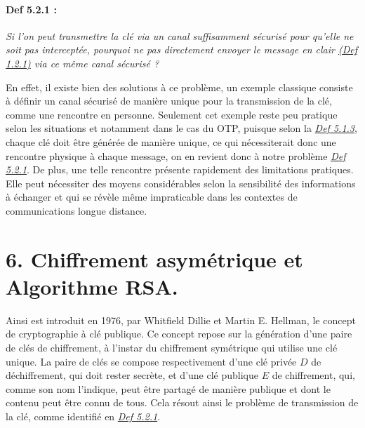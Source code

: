 \documentclass[
  paper=a4,
  ,captions=tableheading
]{scrartcl}
\begin{document}
\paragraph{Def 5.2.1 :}\label{def-5.2.1}

\emph{Si l'on peut transmettre la clé via un canal suffisamment sécurisé
pour qu'elle ne soit pas interceptée, pourquoi ne pas directement
envoyer le message en clair
\href{Introduction\%20au\%20Chiffrement\%20-\%20Théories\%20et\%20Pratiques\%20du\%20Chiffrement\%20Symétrique\%20et\%20Asymétrique\%20avec\%20une\%20Étude\%20de\%20Cas\%20sur\%20l'Algorithme\%20RSA.\#Def\%201.2.1}{(Def
1.2.1)} via ce même canal sécurisé ?}

En effet, il existe bien des solutions à ce problème, un exemple
classique consiste à définir un canal sécurisé de manière unique pour la
transmission de la clé, comme une rencontre en personne. Seulement cet
exemple reste peu pratique selon les situations et notamment dans le cas
du OTP, puisque selon la
\emph{\href{Introduction\%20au\%20Chiffrement\%20-\%20Théories\%20et\%20Pratiques\%20du\%20Chiffrement\%20Symétrique\%20et\%20Asymétrique\%20avec\%20une\%20Étude\%20de\%20Cas\%20sur\%20l'Algorithme\%20RSA.\#Def\%205.1.3}{Def
5.1.3}}, chaque clé doit être générée de manière unique, ce qui
nécessiterait donc une rencontre physique à chaque message, on en
revient donc à notre problème
\emph{\href{Introduction\%20au\%20Chiffrement\%20-\%20Théories\%20et\%20Pratiques\%20du\%20Chiffrement\%20Symétrique\%20et\%20Asymétrique\%20avec\%20une\%20Étude\%20de\%20Cas\%20sur\%20l'Algorithme\%20RSA.\#Def\%205.2.1}{Def
5.2.1}}. De plus, une telle rencontre présente rapidement des
limitations pratiques. Elle peut nécessiter des moyens considérables
selon la sensibilité des informations à échanger et qui se révèle même
impraticable dans les contextes de communications longue distance.

\section{6. Chiffrement asymétrique et Algorithme
RSA.}\label{chiffrement-asymuxe9trique-et-algorithme-rsa.}

Ainsi est introduit en 1976, par Whitfield Dillie et Martin E. Hellman,
le concept de cryptographie à clé publique. Ce concept repose sur la
génération d'une paire de clés de chiffrement, à l'instar du chiffrement
symétrique qui utilise une clé unique. La paire de clés se compose
respectivement d'une clé privée \(D\) de déchiffrement, qui doit rester
secrète, et d'une clé publique \(E\) de chiffrement, qui, comme son nom
l'indique, peut être partagé de manière publique et dont le contenu peut
être connu de tous. Cela résout ainsi le problème de transmission de la
clé, comme identifié en
\emph{\href{Introduction\%20au\%20Chiffrement\%20-\%20Théories\%20et\%20Pratiques\%20du\%20Chiffrement\%20Symétrique\%20et\%20Asymétrique\%20avec\%20une\%20Étude\%20de\%20Cas\%20sur\%20l'Algorithme\%20RSA.\#Def\%205.2.1}{Def
5.2.1}}.
\end{document}

